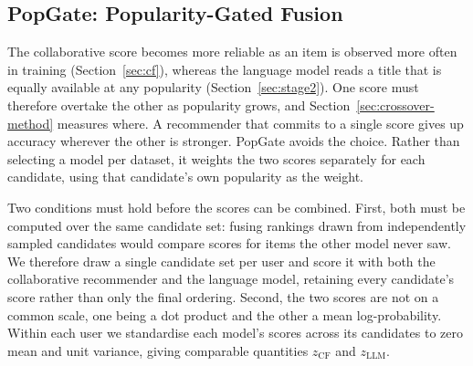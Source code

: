 \documentclass[runningheads]{llncs}
\begin{document}


\subsection{PopGate: Popularity-Gated Fusion}
\label{sec:popgate}

The collaborative score becomes more reliable as an item is observed more often in
training (Section~\ref{sec:cf}), whereas the language model reads a title that is
equally available at any popularity (Section~\ref{sec:stage2}). One score must
therefore overtake the other as popularity grows, and
Section~\ref{sec:crossover-method} measures where. A recommender that commits to a
single score gives up accuracy wherever the other is stronger. PopGate avoids the
choice. Rather than selecting a model per
dataset, it weights the two scores separately for each candidate, using that
candidate's own popularity as the weight.

Two conditions must hold before the scores can be combined. First, both must be
computed over the same candidate set: fusing rankings drawn from independently
sampled candidates would compare scores for items the other model never saw. We
therefore draw a single candidate set per user and score it with both the
collaborative recommender and the language model, retaining every candidate's score
rather than only the final ordering. Second, the two scores are not on a common
scale, one being a dot product and the other a mean log-probability. Within each
user we standardise each model's scores across its candidates to zero mean and unit
variance, giving comparable quantities $z_{\mathrm{CF}}$ and $z_{\mathrm{LLM}}$.
\end{document}
